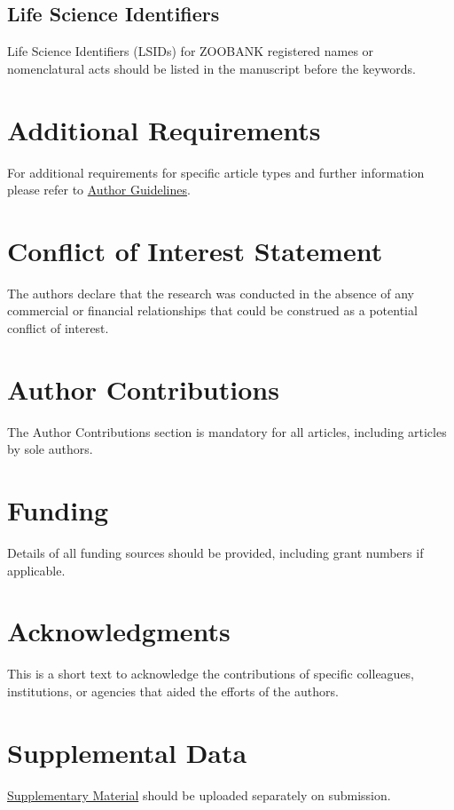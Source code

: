 \documentclass[utf8]{FrontiersinHarvard}
\begin{document}
\subsection{Life Science Identifiers}
Life Science Identifiers (LSIDs) for ZOOBANK registered names or nomenclatural acts should be listed in the manuscript before the keywords.

\section{Additional Requirements}

For additional requirements for specific article types and further information please refer to \href{http://www.frontiersin.org/about/AuthorGuidelines#AdditionalRequirements}{Author Guidelines}.

\section*{Conflict of Interest Statement}
The authors declare that the research was conducted in the absence of any commercial or financial relationships that could be construed as a potential conflict of interest.

\section*{Author Contributions}
The Author Contributions section is mandatory for all articles, including articles by sole authors.

\section*{Funding}
Details of all funding sources should be provided, including grant numbers if applicable.

\section*{Acknowledgments}
This is a short text to acknowledge the contributions of specific colleagues, institutions, or agencies that aided the efforts of the authors.

\section*{Supplemental Data}
\href{http://home.frontiersin.org/about/author-guidelines#SupplementaryMaterial}{Supplementary Material} should be uploaded separately on submission.
\end{document}
